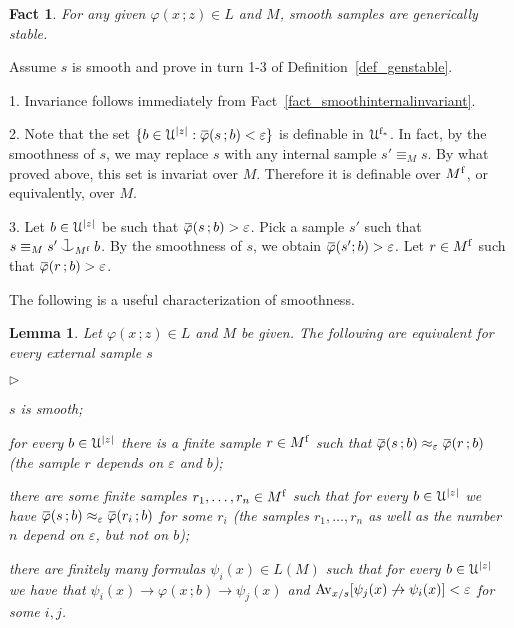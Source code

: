 \documentclass[10pt,openany]{article}
\newcommand{\mylabel}[1]{{\ssf{#1}}\hfill}
\renewenvironment{itemize}
  {\begin{list}{$\triangleright$}{%
   \setlength{\parskip}{0mm}
   \setlength{\topsep}{.4\baselineskip}
   \setlength{\rightmargin}{0mm}
   \setlength{\listparindent}{0mm}
   \setlength{\itemindent}{0mm}
   \setlength{\labelwidth}{3ex}
   \setlength{\itemsep}{.4\baselineskip}
   \setlength{\parsep}{0mm}
   \setlength{\partopsep}{0mm}
   \setlength{\labelsep}{1ex}
   \setlength{\leftmargin}{\labelwidth+\labelsep}
   \let\makelabel\mylabel}}{%
   \end{list}\vspace*{-\parskip}}
\newcommand{\sbar}[1]{\mkern 1.8mu\overline{\mkern-1.8mu#1\mkern-1mu}\mkern 1mu}
\def\cnonfork{\mathbin{\raise1.8ex\rlap{\kern0.6ex\rule{0.6ex}{0.1ex}}
\rlap{\kern1.1ex\rule{0.1ex}{1.9ex}}\raise-0.3ex\hbox{$\smile$} } }
\def\imp{\rightarrow}
\def\U{\EuScript U}
\def\phi{\varphi}
\def\epsilon{\varepsilon}
\def\ssf#1{\textsf{\small #1}}
\newcounter{thm}[section]
\theoremstyle{mio}
\newtheorem{lemma}[thm]{Lemma}
\newtheorem{fact}[thm]{Fact}
\theoremstyle{liscio}
\def\QED{\noindent\nolinebreak[4]\hspace{\stretch{1}}\rlap{\ \ $\Box$}\medskip}
\renewenvironment{proof}[1][Proof]%
{\begin{trivlist}\item[\hskip\labelsep {\bf #1}]}
{\QED\end{trivlist}}
\begin{document}
\begin{fact}
  For any given $\phi(x\,;z)\in L$ and $M$, smooth samples are generically stable.
\end{fact}

\begin{proof}
  Assume $s$ is smooth and prove in turn \ssf{1}-\ssf{3} of Definition~\ref{def_genstable}.
  
  \ssf{1.} Invariance follows immediately from Fact~\ref{fact_smoothinternalinvariant}.
  
  \ssf{2.} Note that the set $\{b\in\U^{|z|}:\sbar\phi(s\,;b)<\epsilon\}$ is definable in $\U^{\rm f_*}$. In fact, by the smoothness of $s$, we may replace $s$ with any internal sample $s'\equiv_Ms$.
  By what proved above, this set is invariat over $M$.
  Therefore it is definable over $M^{\rm f}$, or equivalently, over $M$.
  
  \ssf{3.} Let $b\in\U^{|z|}$ be such that  $\sbar\phi(s\,;b)>\epsilon$.
  Pick a sample $s'$  such that $s\equiv_Ms'\cnonfork_{M^{\rm f}}b$.
  By the smoothness of $s$, we obtain $\sbar\phi(s';b)>\epsilon$.
  Let $r\in M^{\rm f}$ such that $\sbar\phi(r\,;b)>\epsilon$.
\end{proof}


The following is a useful characterization of smoothness.

\begin{lemma}
  Let $\phi(x\,;z)\in L$ and $M$ be given.
  The following are equivalent for every external sample $s$
  \begin{itemize}
    \item[1.] $s$ is smooth;
    \item[2.] for every $b\in\U^{|z|}$ there is a finite sample $r\in M^{\rm f}$ such that $\sbar\phi(s\,;b)\approx_\epsilon\sbar\phi(r\,;b)$ (the sample $r$ depends on $\epsilon$ and $b$);
    \item[3.] there are some finite samples $r_1,\dots,r_n\in M^{\rm f}$ such that for every $b\in\U^{|z|}$ we have $\sbar\phi(s\,;b)\approx_\epsilon\sbar\phi(r_i\,;b)$ for some $r_i$ (the samples $r_1,\dots,r_n$ as well as the number $n$ depend on $\epsilon$, but not on $b$);
    \item[4.] there are finitely many formulas $\psi_i(x)\in L(M)$ such that for every $b\in\U^{|z|}$ we have that $\psi_i(x)\imp\phi(x\,;b)\imp\psi_j(x)$ and $\Av_{x/s}[\psi_j(x)\not\imp\psi_i(x)]<\epsilon$ for some $i,j$.
  \end{itemize}
\end{lemma}
\end{document}
